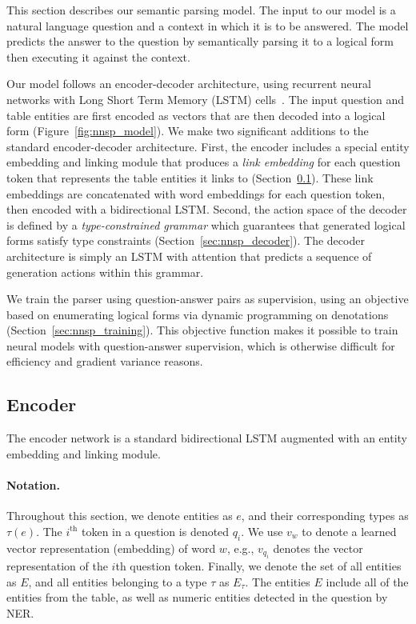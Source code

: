 This section describes our semantic parsing model.
The input to our model is a natural language question and a context in which it 
is to be answered.
The model predicts the answer to the question by semantically parsing it to a 
logical form then executing it against the context.

Our model follows an encoder-decoder architecture, using recurrent neural 
networks with Long Short Term Memory (LSTM) cells~\citep{hochreiter1997long}. 
The input question and table entities are first encoded as vectors that are 
then decoded into a logical form (Figure~\ref{fig:nnsp_model}).
We make two significant additions to the standard encoder-decoder architecture.
First, the encoder includes a special entity embedding and linking module that 
produces a \emph{link embedding} for each question token that represents the 
table entities it links to (Section~\ref{sec:nnsp_encoder}).
These link embeddings are concatenated with word embeddings for each question 
token, then encoded with a bidirectional LSTM\@.
Second, the action space of the decoder is defined by a \emph{type-constrained 
grammar} which guarantees that generated logical forms satisfy type constraints 
(Section~\ref{sec:nnsp_decoder}).
The decoder architecture is simply an LSTM with attention that predicts a 
sequence of generation actions within this grammar.

We train the parser using question-answer pairs as supervision, using an 
objective based on enumerating logical forms via dynamic programming on 
denotations \citep{pasupat2016inferring} (Section~\ref{sec:nnsp_training}). This 
objective function makes it possible to train neural models with 
question-answer supervision, which is otherwise difficult for efficiency and 
gradient variance reasons.

\subsection{Encoder}
\label{sec:nnsp_encoder}

The encoder network is a standard bidirectional LSTM augmented with an entity 
embedding and linking module.

\paragraph{Notation.}
Throughout this section, we denote entities as $e$, and their corresponding 
types as $\tau(e)$. The $i^{\text{th}}$ token in a question is denoted $q_i$. 
We use $v_w$ to denote a learned vector representation (embedding) of word $w$, 
e.g., $v_{q_i}$ denotes the vector representation of the $i$th question token. 
Finally, we denote the set of all entities as $E$, and all entities belonging 
to a type $\tau$ as $E_{\tau}$. The entities $E$ include all of the entities 
from the table, as well as numeric entities detected in the question by NER. 

